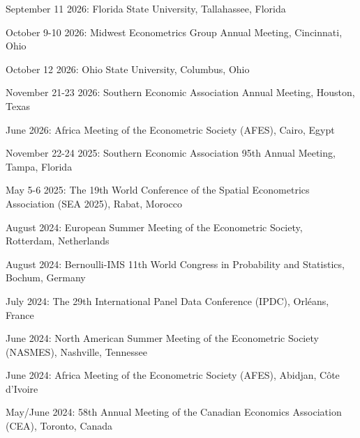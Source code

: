 \documentclass[12pt,letterpaper]{article}
\renewenvironment{itemize}{
  \begin{list}{}{
    \setlength{\leftmargin}{1.5em}
  }
}{
  \end{list}
}
\begin{document}
\begin{itemize}
  \item September 11 2026: Florida State University, Tallahassee, Florida
  
  \item October 9-10 2026: Midwest Econometrics Group Annual Meeting, Cincinnati, Ohio
  
  \item October 12 2026: Ohio State University, Columbus, Ohio
  
  \item November 21-23 2026: Southern Economic Association Annual Meeting, Houston, Texas
  
  \item June 2026: Africa Meeting of the Econometric Society (AFES), Cairo, Egypt
  
  \item November 22-24 2025: Southern Economic Association 95th Annual Meeting, Tampa, Florida
  
  
  \item May 5-6 2025: The 19th World Conference of the Spatial Econometrics Association (SEA 2025), Rabat, Morocco
  
  \item August 2024: European Summer Meeting of the Econometric Society,\\ Rotterdam, Netherlands
  
  \item August 2024: Bernoulli-IMS 11th World Congress in Probability and Statistics, Bochum, Germany
  
  \item July 2024: The 29th International Panel Data Conference (IPDC), Orléans, France
  
  \item June 2024: North American Summer Meeting of the Econometric Society (NASMES), Nashville, Tennessee
  
  \item June 2024: Africa Meeting of the Econometric Society (AFES), Abidjan, Côte d'Ivoire
  
  \item May/June 2024: 58th Annual Meeting of the Canadian Economics Association (CEA), Toronto, Canada


\end{itemize}
\end{document}
